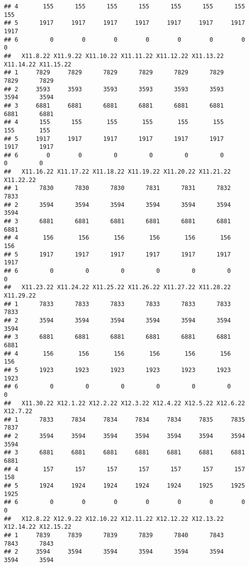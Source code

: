 \documentclass[
]{article}
\begin{document}
\begin{verbatim}
## 4       155      155      155      155      155      155      155      155
## 5      1917     1917     1917     1917     1917     1917     1917     1917
## 6         0        0        0        0        0        0        0        0
##   X11.8.22 X11.9.22 X11.10.22 X11.11.22 X11.12.22 X11.13.22 X11.14.22 X11.15.22
## 1     7829     7829      7829      7829      7829      7829      7829      7829
## 2     3593     3593      3593      3593      3593      3593      3594      3594
## 3     6881     6881      6881      6881      6881      6881      6881      6881
## 4      155      155       155       155       155       155       155       155
## 5     1917     1917      1917      1917      1917      1917      1917      1917
## 6        0        0         0         0         0         0         0         0
##   X11.16.22 X11.17.22 X11.18.22 X11.19.22 X11.20.22 X11.21.22 X11.22.22
## 1      7830      7830      7830      7831      7831      7832      7833
## 2      3594      3594      3594      3594      3594      3594      3594
## 3      6881      6881      6881      6881      6881      6881      6881
## 4       156       156       156       156       156       156       156
## 5      1917      1917      1917      1917      1917      1917      1917
## 6         0         0         0         0         0         0         0
##   X11.23.22 X11.24.22 X11.25.22 X11.26.22 X11.27.22 X11.28.22 X11.29.22
## 1      7833      7833      7833      7833      7833      7833      7833
## 2      3594      3594      3594      3594      3594      3594      3594
## 3      6881      6881      6881      6881      6881      6881      6881
## 4       156       156       156       156       156       156       156
## 5      1923      1923      1923      1923      1923      1923      1923
## 6         0         0         0         0         0         0         0
##   X11.30.22 X12.1.22 X12.2.22 X12.3.22 X12.4.22 X12.5.22 X12.6.22 X12.7.22
## 1      7833     7834     7834     7834     7834     7835     7835     7837
## 2      3594     3594     3594     3594     3594     3594     3594     3594
## 3      6881     6881     6881     6881     6881     6881     6881     6881
## 4       157      157      157      157      157      157      157      158
## 5      1924     1924     1924     1924     1924     1925     1925     1925
## 6         0        0        0        0        0        0        0        0
##   X12.8.22 X12.9.22 X12.10.22 X12.11.22 X12.12.22 X12.13.22 X12.14.22 X12.15.22
## 1     7839     7839      7839      7839      7840      7843      7843      7843
## 2     3594     3594      3594      3594      3594      3594      3594      3594

\end{verbatim}
\end{document}
